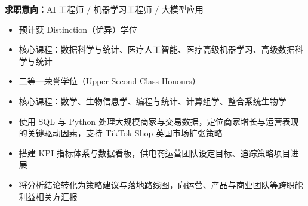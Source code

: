 \documentclass{zh_resume}
\begin{document}
\centerline{\small \textbf{求职意向：}AI 工程师 / 机器学习工程师 / 大模型应用}



\begin{itemize}
  \item 预计获 Distinction（优异）学位
  \item 核心课程：数据科学与统计、医疗人工智能、医疗高级机器学习、高级数据科学与统计
\end{itemize}


\begin{itemize}
  \item 二等一荣誉学位（Upper Second-Class Honours）
  \item 核心课程：数学、生物信息学、编程与统计、计算组学、整合系统生物学
\end{itemize}



\begin{itemize}
  \item 使用 SQL 与 Python 处理大规模商家与交易数据，定位商家增长与运营表现的关键驱动因素，支持 TikTok Shop 英国市场扩张策略
  \item 搭建 KPI 指标体系与数据看板，供电商运营团队设定目标、追踪策略项目进展
  \item 将分析结论转化为策略建议与落地路线图，向运营、产品与商业团队等跨职能利益相关方汇报
\end{itemize}

\end{document}
